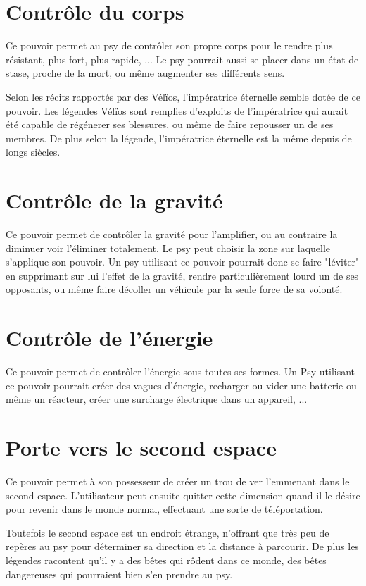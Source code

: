 \begin{multicols*}{2}
\section{Contrôle du corps}

Ce pouvoir permet au psy de contrôler son propre corps pour le rendre plus résistant, plus fort, plus rapide, ... Le psy pourrait aussi se placer dans un état de stase, proche de la mort, ou même augmenter ses différents sens.

Selon les récits rapportés par des Vélïos, l'impératrice éternelle semble dotée de ce pouvoir. Les légendes Vélïos sont remplies d'exploits de l'impératrice qui aurait été capable de régénerer ses blessures, ou même de faire repousser un de ses membres. De plus selon la légende, l'impératrice éternelle est la même depuis de longs siècles.

\section{Contrôle de la gravité}

Ce pouvoir permet de contrôler la gravité pour l'amplifier, ou au contraire la diminuer voir l'éliminer totalement. Le psy peut choisir la zone sur laquelle s'applique son pouvoir. Un psy utilisant ce pouvoir pourrait donc se faire "léviter" en supprimant sur lui l'effet de la gravité, rendre particulièrement lourd un de ses opposants, ou même faire décoller un véhicule par la seule force de sa volonté.

\section{Contrôle de l'énergie}

Ce pouvoir permet de contrôler l'énergie sous toutes ses formes. Un Psy utilisant ce pouvoir pourrait créer des vagues d'énergie, recharger ou vider une batterie ou même un réacteur, créer une surcharge électrique dans un appareil, ...

\section{Porte vers le second espace}

Ce pouvoir permet à son possesseur de créer un trou de ver l'emmenant dans le second espace. L'utilisateur peut ensuite quitter cette dimension quand il le désire pour revenir dans le monde normal, effectuant une sorte de téléportation. 

Toutefois le second espace est un endroit étrange, n'offrant que très peu de repères au psy pour déterminer sa direction et la distance à parcourir. De plus les légendes racontent qu'il y a des bêtes qui rôdent dans ce monde, des bêtes dangereuses qui pourraient bien s'en prendre au psy.


\end{multicols*}
